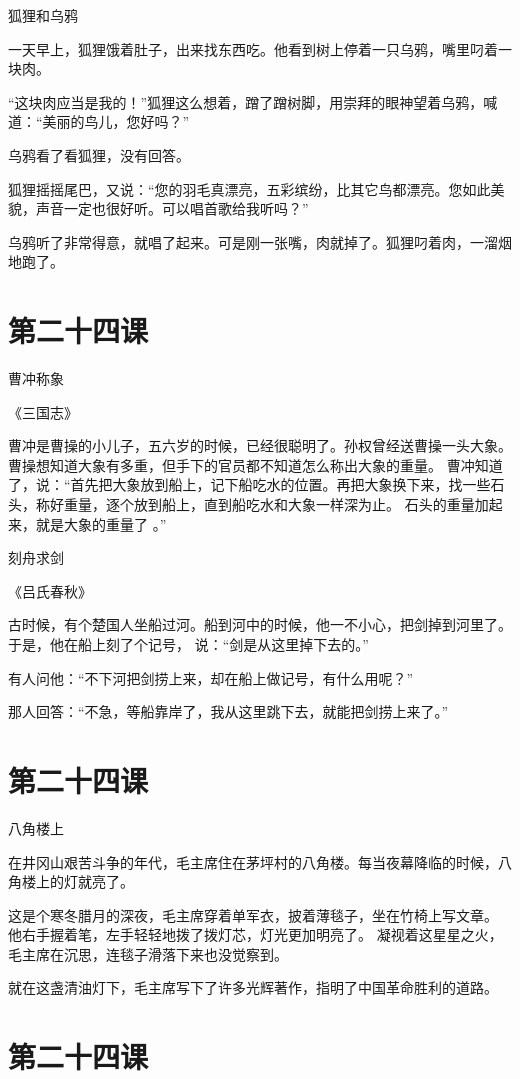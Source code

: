 \documentclass[12pt,UTF8]{ctexbook}
\begin{document}
狐狸和乌鸦

一天早上，狐狸饿着肚子，出来找东西吃。他看到树上停着一只乌鸦，嘴里叼着一块肉。

“这块肉应当是我的！”狐狸这么想着，蹭了蹭树脚，用崇拜的眼神望着乌鸦，喊道：“美丽的鸟儿，您好吗？”

乌鸦看了看狐狸，没有回答。

狐狸摇摇尾巴，又说：“您的羽毛真漂亮，五彩缤纷，比其它鸟都漂亮。您如此美貌，声音一定也很好听。可以唱首歌给我听吗？”

乌鸦听了非常得意，就唱了起来。可是刚一张嘴，肉就掉了。狐狸叼着肉，一溜烟地跑了。

\section{第二十四课}

曹冲称象 

《三国志》

曹冲是曹操的小儿子，五六岁的时候，已经很聪明了。孙权曾经送曹操一头大象。
曹操想知道大象有多重，但手下的官员都不知道怎么称出大象的重量。
曹冲知道了，说：“首先把大象放到船上，记下船吃水的位置。再把大象换下来，找一些石头，称好重量，逐个放到船上，直到船吃水和大象一样深为止。
石头的重量加起来，就是大象的重量了  。”


刻舟求剑

《吕氏春秋》

古时候，有个楚国人坐船过河。船到河中的时候，他一不小心，把剑掉到河里了。于是，他在船上刻了个记号，
说：“剑是从这里掉下去的。”

有人问他：“不下河把剑捞上来，却在船上做记号，有什么用呢？”

那人回答：“不急，等船靠岸了，我从这里跳下去，就能把剑捞上来了。”

\section{第二十四课}

八角楼上

在井冈山艰苦斗争的年代，毛主席住在茅坪村的八角楼。每当夜幕降临的时候，八角楼上的灯就亮了。

这是个寒冬腊月的深夜，毛主席穿着单军衣，披着薄毯子，坐在竹椅上写文章。
他右手握着笔，左手轻轻地拨了拨灯芯，灯光更加明亮了。
凝视着这星星之火，毛主席在沉思，连毯子滑落下来也没觉察到。

就在这盏清油灯下，毛主席写下了许多光辉著作，指明了中国革命胜利的道路。

\section{第二十四课}
\end{document}
